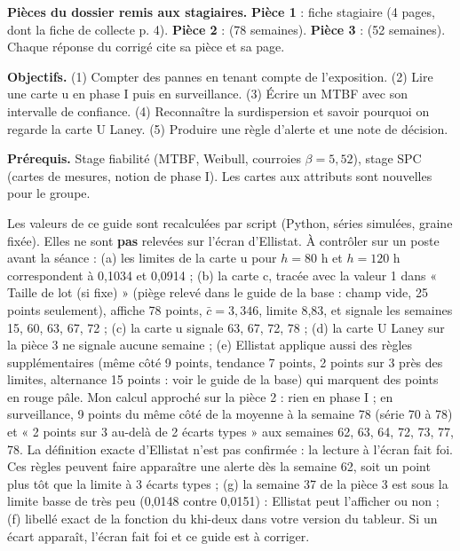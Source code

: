 \documentclass[10pt,a4paper]{article}
\begin{document}
\thispagestyle{fancy}

\begin{tcolorbox}[boite]
\textbf{Pièces du dossier remis aux stagiaires.} \textbf{Pièce 1} : fiche stagiaire (4 pages, dont la fiche de collecte p. 4). \textbf{Pièce 2} :  (78 semaines). \textbf{Pièce 3} :  (52 semaines). Chaque réponse du corrigé cite sa pièce et sa page.\par
\textbf{Objectifs.} (1) Compter des pannes en tenant compte de l'exposition. (2) Lire une carte u en phase I puis en surveillance. (3) Écrire un MTBF avec son intervalle de confiance. (4) Reconnaître la surdispersion et savoir pourquoi on regarde la carte U Laney. (5) Produire une règle d'alerte et une note de décision.\par
\textbf{Prérequis.} Stage fiabilité (MTBF, Weibull, courroies $\beta = 5{,}52$), stage SPC (cartes de mesures, notion de phase I). Les cartes aux attributs sont nouvelles pour le groupe.
\end{tcolorbox}

\begin{tcolorbox}[verif]
Les valeurs de ce guide sont recalculées par script (Python, séries simulées, graine fixée). Elles ne sont \textbf{pas} relevées sur l'écran d'Ellistat. À contrôler sur un poste avant la séance : (a) les limites de la carte u pour $h = 80$ h et $h = 120$ h correspondent à 0,1034 et 0,0914 ; (b) la carte c, tracée avec la valeur 1 dans « Taille de lot (si fixe) » (piège relevé dans le guide de la base : champ vide, 25 points seulement), affiche 78 points, $\bar c = 3{,}346$, limite 8,83, et signale les semaines 15, 60, 63, 67, 72 ; (c) la carte u signale 63, 67, 72, 78 ; (d) la carte U Laney sur la pièce 3 ne signale aucune semaine ; (e) Ellistat applique aussi des règles supplémentaires (même côté 9 points, tendance 7 points, 2 points sur 3 près des limites, alternance 15 points : voir le guide de la base) qui marquent des points en rouge pâle. Mon calcul approché sur la pièce 2 : rien en phase I ; en surveillance, 9 points du même côté de la moyenne à la semaine 78 (série 70 à 78) et « 2 points sur 3 au-delà de 2 écarts types » aux semaines 62, 63, 64, 72, 73, 77, 78. La définition exacte d'Ellistat n'est pas confirmée : la lecture à l'écran fait foi. Ces règles peuvent faire apparaître une alerte dès la semaine 62, soit un point plus tôt que la limite à 3 écarts types ;
(g) la semaine 37 de la pièce 3 est sous la limite basse de très peu (0,0148 contre 0,0151) : Ellistat peut l'afficher ou non ; (f) libellé exact de la fonction du khi-deux dans votre version du tableur. Si un écart apparaît, l'écran fait foi et ce guide est à corriger.
\end{tcolorbox}
\end{document}

